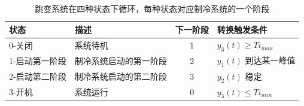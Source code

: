 \begin{table}[]
\centering
\caption{跳变系统在四种状态下循环，每种状态对应制冷系统的一个阶段}
\label{tab:cooling_dfa}
\begin{tabular}{llcl}
\toprule
   状态                  &    描述             & 下一阶段 & 转换触发条件                                   \\ 
   \hline
0-关闭                       & 系统待机                             & 1          & $y_3(t)\geq Ti_{max}$                                \\
1-启动第一阶段                      & 制冷系统启动的第一阶段                     & 2          & $y_1(t)$ 到达某一峰值                            \\
2-启动第二阶段                       & 制冷系统启动的第二阶段 & 3          & \multicolumn{1}{l}{$y_2(t)$ 稳定} \\
3-开机                       & 系统运行                                   & 0          & $y_3(t)\leq Ti_{min}$                                \\
\bottomrule
\end{tabular}
\end{table}




